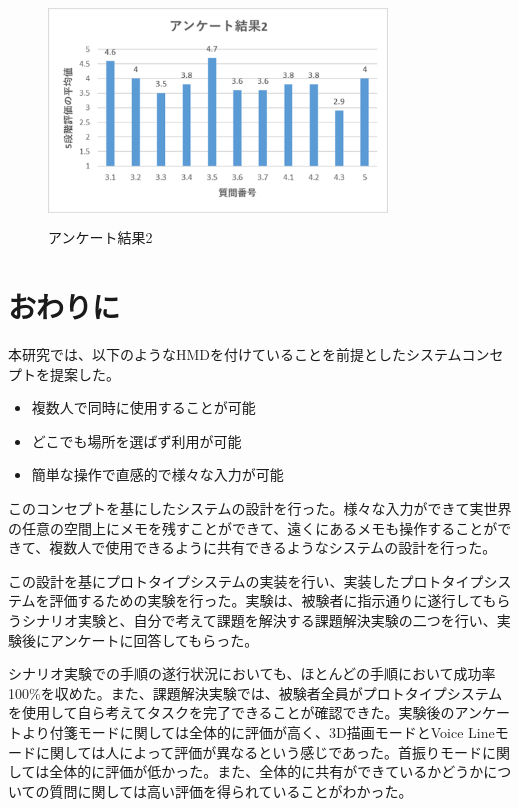 \documentclass[technicalreport]{ieicej}
\begin{document}
\begin{figure}[h]
  \begin{center}
    \includegraphics[clip,height=6.0cm,width=9.0cm]{./question2.eps}
    \caption{アンケート結果2}
    \label{fig:question2}
  \end{center}
\end{figure}

\section{おわりに}
本研究では、以下のようなHMDを付けていることを前提としたシステムコンセプトを提案した。

\begin{itemize}
	\item 複数人で同時に使用することが可能
        \item どこでも場所を選ばず利用が可能
	\item 簡単な操作で直感的で様々な入力が可能
\end{itemize}

このコンセプトを基にしたシステムの設計を行った。様々な入力ができて実世界の任意の空間上にメモを残すことができて、遠くにあるメモも操作することができて、複数人で使用できるように共有できるようなシステムの設計を行った。

この設計を基にプロトタイプシステムの実装を行い、実装したプロトタイプシステムを評価するための実験を行った。実験は、被験者に指示通りに遂行してもらうシナリオ実験と、自分で考えて課題を解決する課題解決実験の二つを行い、実験後にアンケートに回答してもらった。

シナリオ実験での手順の遂行状況においても、ほとんどの手順において成功率100\%を収めた。また、課題解決実験では、被験者全員がプロトタイプシステムを使用して自ら考えてタスクを完了できることが確認できた。実験後のアンケートより付箋モードに関しては全体的に評価が高く、3D描画モードとVoice Lineモードに関しては人によって評価が異なるという感じであった。首振りモードに関しては全体的に評価が低かった。また、全体的に共有ができているかどうかについての質問に関しては高い評価を得られていることがわかった。
\end{document}
